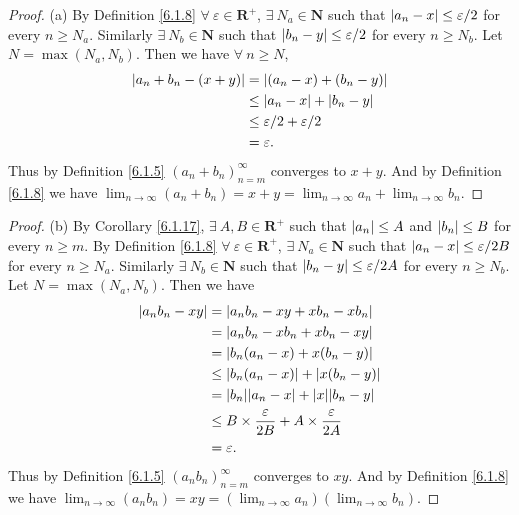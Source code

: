\begin{proof}{(a)}
    By Definition \ref{6.1.8} \(\forall\ \varepsilon \in \mathbf{R}^+\), \(\exists\ N_a \in \mathbf{N}\) such that \(\abs*{a_n - x} \leq \varepsilon / 2\) for every \(n \geq N_a\).
    Similarly \(\exists\ N_b \in \mathbf{N}\) such that \(\abs*{b_n - y} \leq \varepsilon / 2\) for every \(n \geq N_b\).
    Let \(N = \max(N_a, N_b)\).
    Then we have \(\forall\ n \geq N\),
    \begin{align*}
        \abs*{a_n + b_n - (x + y)} & = \abs*{(a_n - x) + (b_n - y)}         \\
                                   & \leq \abs*{a_n - x} + \abs*{b_n - y}   \\
                                   & \leq \varepsilon / 2 + \varepsilon / 2 \\
                                   & = \varepsilon.
    \end{align*}
    Thus by Definition \ref{6.1.5} \((a_n + b_n)_{n = m}^\infty\) converges to \(x + y\).
    And by Definition \ref{6.1.8} we have \(\lim_{n \to \infty} (a_n + b_n) = x + y = \lim_{n \to \infty} a_n + \lim_{n \to \infty} b_n\).
\end{proof}

\begin{proof}{(b)}
    By Corollary \ref{6.1.17}, \(\exists\ A, B \in \mathbf{R}^+\) such that \(\abs*{a_n} \leq A\) and \(\abs*{b_n} \leq B\) for every \(n \geq m\).
    By Definition \ref{6.1.8} \(\forall\ \varepsilon \in \mathbf{R}^+\), \(\exists\ N_a \in \mathbf{N}\) such that \(\abs*{a_n - x} \leq \varepsilon / 2B\) for every \(n \geq N_a\).
    Similarly \(\exists\ N_b \in \mathbf{N}\) such that \(\abs*{b_n - y} \leq \varepsilon / 2A\) for every \(n \geq N_b\).
    Let \(N = \max(N_a, N_b)\).
    Then we have
    \begin{align*}
        \abs*{a_n b_n - x y} & = \abs*{a_n b_n - x y + x b_n - x b_n}                                 \\
                             & = \abs*{a_n b_n - x b_n + x b_n - x y}                                 \\
                             & = \abs*{b_n(a_n - x) + x(b_n - y)}                                     \\
                             & \leq \abs*{b_n(a_n - x)} + \abs*{x(b_n - y)}                           \\
                             & = \abs*{b_n}\abs*{a_n - x} + \abs*{x}\abs*{b_n - y}                    \\
                             & \leq B \times \frac{\varepsilon}{2B} + A \times \frac{\varepsilon}{2A} \\
                             & = \varepsilon.
    \end{align*}
    Thus by Definition \ref{6.1.5} \((a_n b_n)_{n = m}^\infty\) converges to \(x y\).
    And by Definition \ref{6.1.8} we have \(\lim_{n \to \infty} (a_n b_n) = x y = (\lim_{n \to \infty} a_n)(\lim_{n \to \infty} b_n)\).
\end{proof}


